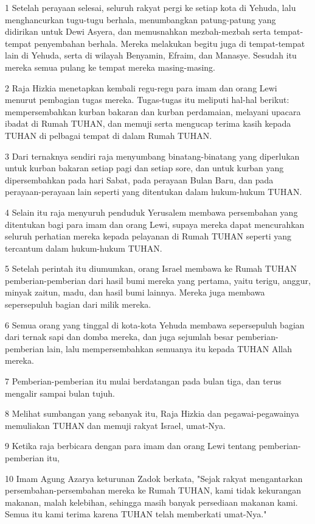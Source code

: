 \par 1 Setelah perayaan selesai, seluruh rakyat pergi ke setiap kota di Yehuda, lalu menghancurkan tugu-tugu berhala, menumbangkan patung-patung yang didirikan untuk Dewi Asyera, dan memusnahkan mezbah-mezbah serta tempat-tempat penyembahan berhala. Mereka melakukan begitu juga di tempat-tempat lain di Yehuda, serta di wilayah Benyamin, Efraim, dan Manasye. Sesudah itu mereka semua pulang ke tempat mereka masing-masing.
\par 2 Raja Hizkia menetapkan kembali regu-regu para imam dan orang Lewi menurut pembagian tugas mereka. Tugas-tugas itu meliputi hal-hal berikut: mempersembahkan kurban bakaran dan kurban perdamaian, melayani upacara ibadat di Rumah TUHAN, dan memuji serta mengucap terima kasih kepada TUHAN di pelbagai tempat di dalam Rumah TUHAN.
\par 3 Dari ternaknya sendiri raja menyumbang binatang-binatang yang diperlukan untuk kurban bakaran setiap pagi dan setiap sore, dan untuk kurban yang dipersembahkan pada hari Sabat, pada perayaan Bulan Baru, dan pada perayaan-perayaan lain seperti yang ditentukan dalam hukum-hukum TUHAN.
\par 4 Selain itu raja menyuruh penduduk Yerusalem membawa persembahan yang ditentukan bagi para imam dan orang Lewi, supaya mereka dapat mencurahkan seluruh perhatian mereka kepada pelayanan di Rumah TUHAN seperti yang tercantum dalam hukum-hukum TUHAN.
\par 5 Setelah perintah itu diumumkan, orang Israel membawa ke Rumah TUHAN pemberian-pemberian dari hasil bumi mereka yang pertama, yaitu terigu, anggur, minyak zaitun, madu, dan hasil bumi lainnya. Mereka juga membawa sepersepuluh bagian dari milik mereka.
\par 6 Semua orang yang tinggal di kota-kota Yehuda membawa sepersepuluh bagian dari ternak sapi dan domba mereka, dan juga sejumlah besar pemberian-pemberian lain, lalu mempersembahkan semuanya itu kepada TUHAN Allah mereka.
\par 7 Pemberian-pemberian itu mulai berdatangan pada bulan tiga, dan terus mengalir sampai bulan tujuh.
\par 8 Melihat sumbangan yang sebanyak itu, Raja Hizkia dan pegawai-pegawainya memuliakan TUHAN dan memuji rakyat Israel, umat-Nya.
\par 9 Ketika raja berbicara dengan para imam dan orang Lewi tentang pemberian-pemberian itu,
\par 10 Imam Agung Azarya keturunan Zadok berkata, "Sejak rakyat mengantarkan persembahan-persembahan mereka ke Rumah TUHAN, kami tidak kekurangan makanan, malah kelebihan, sehingga masih banyak persediaan makanan kami. Semua itu kami terima karena TUHAN telah memberkati umat-Nya."
